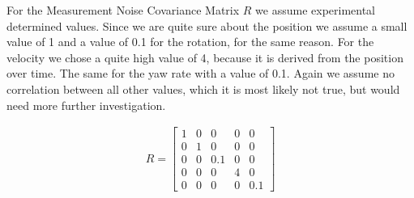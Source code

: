 \documentclass[11pt,oneside,openright]{mpreport}
\begin{document}
For the Measurement Noise Covariance Matrix $R$ we assume experimental determined values. Since we are quite sure about the position we
assume a small value of 1 and a value of 0.1 for the rotation, for the same reason. For the velocity we chose a quite high value of 4,
because it is derived from the position over time. The same for the yaw rate with a value of 0.1. Again we assume no correlation between all other values,
which it is most likely not true, but would need more further investigation.

\begin{align*}
R=
\begin{bmatrix}
1 & 0 & 0 & 0 & 0\\
0 & 1 & 0 & 0 & 0\\
0 & 0 & 0.1 & 0 & 0\\
0 & 0 & 0 & 4 & 0\\
0 & 0 & 0 & 0 & 0.1
\end{bmatrix} 
\end{align*}





\end{document}
